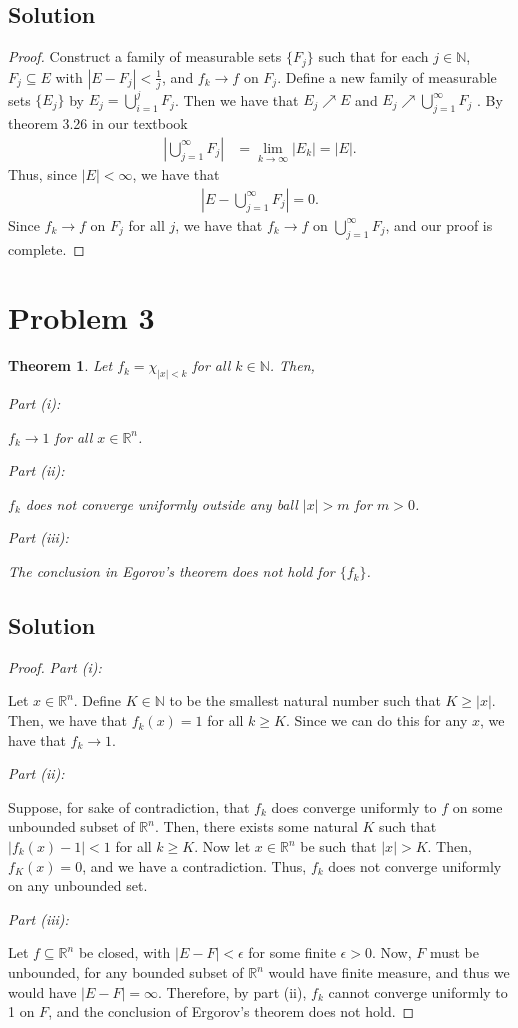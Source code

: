 \documentclass[10pt,a4paper]{article}
\makeatletter
\theoremstyle{theorem}
\newtheorem{theorem}{Theorem}
\newcommand{\proofpart}[2]{%
  \par
  \addvspace{\medskipamount}%
  \noindent\emph{Part #1: #2}\par\nobreak
  \addvspace{\smallskipamount}%
  \@afterheading
}
\theoremstyle{definition}
\makeatother
\begin{document}
\subsection*{Solution}
\begin{proof}
Construct a family of measurable sets $\{F_j\}$ such that for each $j \in \mathbb{N}$, $F_j \subseteq E$ with $|E - F_j| < \frac{1}{j}$, and $f_k \to f$ on $F_j$.  Define a new family of measurable sets $\{E_j \}$ by $E_j = \bigcup_{i = 1}^j F_j$. Then we have that $E_j \nearrow E$ and $E_j \nearrow  \bigcup_{j=1}^\infty F_j$ . By theorem 3.26 in our textbook
\begin{align*}
\left| \bigcup_{j=1}^\infty F_j \right| &= \lim_{k \to \infty} |E_k| = |E|.
\end{align*}
Thus, since $|E| < \infty$, we have that
\begin{align*}
\left| E - \bigcup_{j=1}^\infty F_j \right| = 0.
\end{align*}
Since $f_k \to f$ on $F_j$ for all $j$, we have that $f_k \to f$ on $ \bigcup_{j=1}^\infty F_j $, and our proof is complete.
\end{proof}

\section*{Problem 3}
\begin{theorem}
Let $f_k = \chi_{|x| < k}$ for all $k \in \mathbb{N}$. Then,
\proofpart{(i)}{} $f_k \to 1$ for all $x \in \mathbb{R}^n$.
\proofpart{(ii)}{} $f_k$ does not converge uniformly outside any ball $|x| > m$ for $m > 0$.
\proofpart{(iii)}{} The conclusion in Egorov's theorem does not hold for $\{f_k\}$.
\end{theorem}

\subsection*{Solution}
\begin{proof}
\proofpart{(i)}{} Let $x \in \mathbb{R}^n$. Define $K \in \mathbb{N}$ to be the smallest natural number such that $K \geq 	|x|$. Then, we have that $f_k(x) = 1$ for all $k \geq K$. Since we can do this for any $x$, we have that $f_k \to 1$.

\proofpart{(ii)}{} Suppose, for sake of contradiction, that $f_k$ does converge uniformly to $f$ on some unbounded subset of $\mathbb{R}^n$. Then, there exists some natural $K$ such that $|f_k(x) - 1| < 1$ for all $k \geq K$. Now let $x \in \mathbb{R}^n$ be such that $|x| > K$. Then, $f_K(x) = 0$, and we have a contradiction. Thus, $f_k$ does not converge uniformly on any unbounded set.

\proofpart{(iii)}{} Let $f \subseteq \mathbb{R}^n$ be closed, with $|E - F| < \epsilon$ for some finite $\epsilon > 0$. Now, $F$ must be unbounded, for any bounded subset of $\mathbb{R}^n$ would have finite measure, and thus we would have $|E - F| = \infty$. Therefore, by part (ii), $f_k$ cannot converge uniformly to 1 on $F$, and the conclusion of Ergorov's theorem does not hold.
\end{proof}
\end{document}
